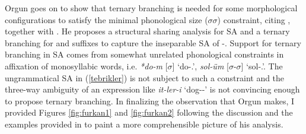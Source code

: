 Orgun goes on to show that ternary branching is needed for some morphological configurations to satisfy the minimal phonological size ($\sigma\sigma$) constraint, citing \citet{ito1989notes}, together with \citet{orgun1992turkish}. He proposes a structural sharing analysis for SA and a ternary branching for {\Pl} and {\Poss} suffixes to capture the inseparable SA of {\Pl-\Poss}. Support for ternary branching in SA comes from somewhat unrelated phonological constraints in affixation of monosyllabic words, i.e. \textit{*do-m} [$\sigma$] `do-{\Poss}.{\Fsg}', \textit{sol-üm} [$\sigma$-$\sigma$] `sol-{\Poss}.{\Fsg}'. The ungrammatical SA in (\ref{tebrikler}) is not subject to such a constraint and the three-way ambiguity of an expression like \textit{it-ler-i} `dog-{\Pl}-{\Poss}' is not convincing enough to propose ternary branching. In finalizing the observation that Orgun makes, I provided Figures \ref{fig:furkan1} and \ref{fig:furkan2} following the discussion and the examples provided in \citet{orgun1995flat} to paint a more comprehensible picture of his analysis.
